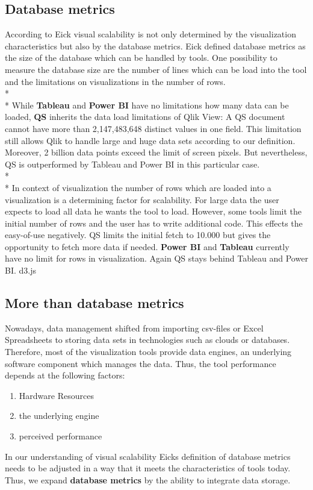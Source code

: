 \subsection{Database metrics}
According to Eick visual scalability is not only determined by the visualization characteristics but also by the database metrics. Eick defined database metrics as the size of the database which can be handled by tools\cite{Eick2002}. One possibility to measure the database size are the number of lines which can be load into the tool and the limitations on visualizations in the number of rows.\\*\\*
While \textbf{Tableau} and \textbf{Power BI} have no limitations how many data can be loaded, \textbf{QS} inherits the data load limitations of Qlik View: A QS document cannot have more than 2,147,483,648 distinct values in one field. This limitation still allows Qlik to handle large and huge data sets according to our definition. Moreover, 2 billion data points exceed the limit of screen pixels. But nevertheless, QS is outperformed by Tableau and Power BI in this particular case.
\\*\\*
In context of visualization the number of rows which are loaded into a visualization is a determining factor for scalability. For large data the user expects to load all data he wants the tool to load. However, some tools limit the initial number of rows and the user has to write additional code. This effects the easy-of-use negatively.
QS limits the initial fetch to 10.000 but gives the opportunity to fetch more data if needed. \textbf{Power BI} and \textbf{Tableau} currently have no limit for rows in visualization.
Again QS stays behind Tableau and Power BI.
d3.js 

\subsection*{More than database metrics}
Nowadays, data management shifted from importing csv-files or Excel Spreadsheets to storing data sets in technologies such as clouds or databases. 
Therefore, most of the visualization tools provide data engines, an underlying software component which manages the data. Thus, the tool performance depends at the following factors:
\begin{enumerate}
    \item Hardware Resources
    \item the underlying engine
    \item perceived performance 
\end{enumerate}
In our understanding of visual scalability Eicks definition of database metrics needs to be adjusted in a way that it meets the characteristics of tools today. Thus, we expand \textbf{database metrics} by the ability to integrate data storage.

